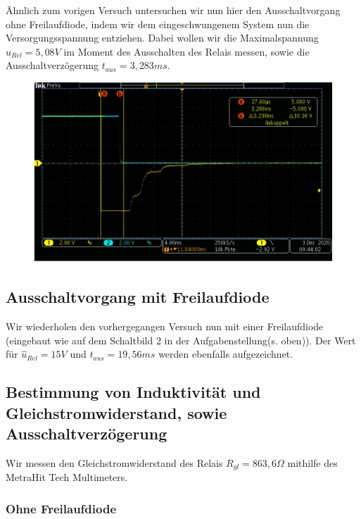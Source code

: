 \documentclass{article}
\begin{document}
Ähnlich zum vorigen Versuch untersuchen wir nun hier den Ausschaltvorgang ohne Freilaufdiode, indem wir dem eingeschwungenem System nun die 
Versorgungsspannung entziehen. Dabei wollen wir die Maximalspannung $\hat{u}_{Rel} = 5,08V$ im Moment des Ausschalten des Relais messen, sowie die Ausschaltverzögerung
$t_{aus} = 3,283ms$.

\begin{figure}
    \begin{center}
        \includegraphics[scale=0.45]{../assets/images/ET2P4/aufgabe2c.JPG}
    \end{center}
\end{figure}

\subsection{Ausschaltvorgang mit Freilaufdiode}

Wir wiederholen den vorhergegangen Versuch nun mit einer Freilaufdiode (eingebaut wie auf dem Schaltbild 2 in der Aufgabenstellung(s. oben)). Der Wert für $\hat{u}_{Rel} = 15V$ und $t_{aus} = 19,56ms$ werden 
ebenfalls aufgezeichnet.

\subsection{Bestimmung von Induktivität und Gleichstromwiderstand, sowie Ausschaltverzögerung}

Wir messen den Gleichstromwiderstand des Relais $R_{gl} = 863,6\Omega$ mithilfe des MetraHit Tech Multimeters.
\subsubsection{Ohne Freilaufdiode}
\end{document}
